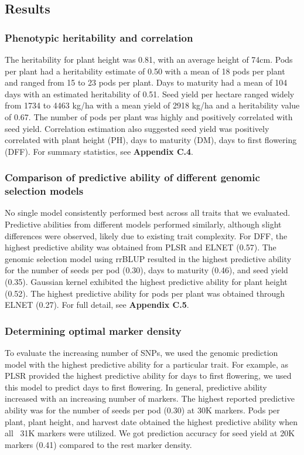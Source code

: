 \documentclass[12pt, letterpaper,oneocolumn]{article}
\begin{document}
	\subsection{Results}
	\subsubsection{Phenotypic heritability and correlation}
	The heritability for plant height was 0.81, with an average height of 74cm. Pods per plant had a heritability estimate of 0.50 with a mean of 18 pods per plant and ranged from 15 to 23 pods per plant. Days to maturity had a mean of 104 days with an estimated heritability of 0.51. Seed yield per hectare ranged widely from 1734 to 4463 kg/ha with a mean yield of 2918 kg/ha and a heritability value of 0.67. The number of pods per plant was highly and positively correlated with seed yield. Correlation estimation also suggested seed yield was positively correlated with plant height (PH), days to maturity (DM), days to first flowering (DFF). For summary statistics, see \textbf{Appendix C.4}.

	\subsubsection{Comparison of predictive ability of different genomic selection models} No single model consistently performed best across all traits that we evaluated. Predictive abilities from different models performed similarly, although slight differences were observed, likely due to existing trait complexity. For DFF, the highest predictive ability was obtained from PLSR and ELNET (0.57). The genomic selection model using rrBLUP resulted in the highest predictive ability for the number of seeds per pod (0.30), days to maturity (0.46), and seed yield (0.35). Gaussian kernel exhibited the highest predictive ability for plant height (0.52). The highest predictive ability for pods per plant was obtained through ELNET (0.27). For full detail,  see \textbf{Appendix C.5}.

	\subsubsection{Determining optimal marker density} To evaluate the increasing number of SNPs, we used the genomic prediction model with the highest predictive ability for a particular trait. For example, as PLSR provided the highest predictive ability for days to first flowering, we used this model to predict days to first flowering. In general, predictive ability increased with an increasing number of markers. The highest reported predictive ability was for the number of seeds per pod (0.30) at 30K markers. Pods per plant, plant height, and harvest date obtained the highest predictive ability when all ~31K markers were utilized. We got prediction accuracy for seed yield at 20K markers (0.41) compared to the rest marker density.
\end{document}
